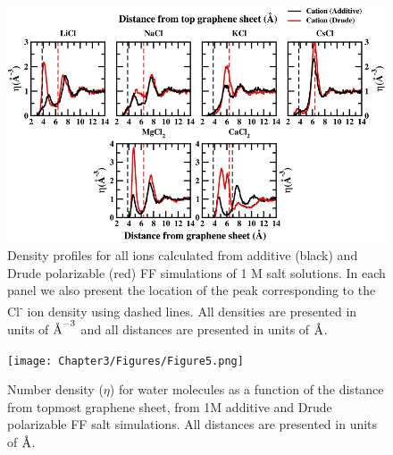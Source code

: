 \begin{figure}
    \centering
    \includegraphics[width=\textwidth]{Chapter3/Figures/Figure4.png}
    \caption[Density profiles for all ions calculated from additive and Drude polarizable FF simulations of 1 M salt solutions. Location of the peak corresponding to the Cl\textsuperscript{-} ion density is depicted using dashed lines]{Density profiles for all ions calculated from additive (black) and Drude polarizable (red) FF simulations of 1 M salt solutions. In each panel we also present the location of the peak corresponding to the Cl\textsuperscript{-} ion density using dashed lines. All densities are presented in units of $\text{\normalfont\AA}^{-3}$ and all distances are presented in units of $\text{\normalfont\AA}$.}
\end{figure}

\begin{figure}
    \centering
    \texttt{[image: Chapter3/Figures/Figure5.png]}
    \caption[Number density ($\eta$) for water molecules as a function of the distance from topmost graphene sheet, from 1M additive and Drude polarizable FF salt simulations]{Number density ($\eta$) for water molecules as a function of the distance from topmost graphene sheet, from 1M additive and Drude polarizable FF salt simulations. All distances are presented in units of $\text{\normalfont\AA}$.}
\end{figure}

